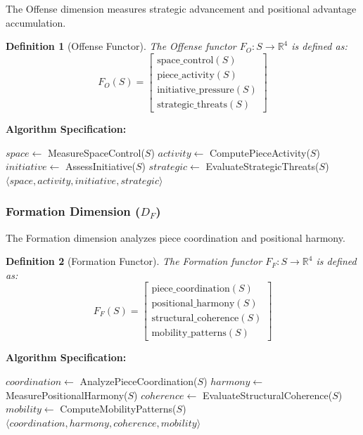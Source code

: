 \documentclass[12pt,a4paper]{article}
\newtheorem{definition}{Definition}
\begin{document}
The Offense dimension measures strategic advancement and positional advantage accumulation.

\begin{definition}[Offense Functor]
The Offense functor $F_O: S \rightarrow \mathbb{R}^4$ is defined as:
$$F_O(S) = \begin{bmatrix}
\text{space\_control}(S) \\
\text{piece\_activity}(S) \\
\text{initiative\_pressure}(S) \\
\text{strategic\_threats}(S)
\end{bmatrix}$$
\end{definition}

\textbf{Algorithm Specification:}
\begin{algorithm}[H]
\caption{Offense Algorithm}
\begin{algorithmic}
    \State $space \leftarrow$ MeasureSpaceControl($S$)
    \State $activity \leftarrow$ ComputePieceActivity($S$)
    \State $initiative \leftarrow$ AssessInitiative($S$)
    \State $strategic \leftarrow$ EvaluateStrategicThreats($S$)
    \State \Return $\langle space, activity, initiative, strategic \rangle$
\EndFunction
\end{algorithmic}
\end{algorithm}

\subsubsection{Formation Dimension (\texorpdfstring{$D_F$}{DF})}

The Formation dimension analyzes piece coordination and positional harmony.

\begin{definition}[Formation Functor]
The Formation functor $F_F: S \rightarrow \mathbb{R}^4$ is defined as:
$$F_F(S) = \begin{bmatrix}
\text{piece\_coordination}(S) \\
\text{positional\_harmony}(S) \\
\text{structural\_coherence}(S) \\
\text{mobility\_patterns}(S)
\end{bmatrix}$$
\end{definition}

\textbf{Algorithm Specification:}
\begin{algorithm}[H]
\caption{Formation Algorithm}
\begin{algorithmic}
    \State $coordination \leftarrow$ AnalyzePieceCoordination($S$)
    \State $harmony \leftarrow$ MeasurePositionalHarmony($S$)
    \State $coherence \leftarrow$ EvaluateStructuralCoherence($S$)
    \State $mobility \leftarrow$ ComputeMobilityPatterns($S$)
    \State \Return $\langle coordination, harmony, coherence, mobility \rangle$
\EndFunction
\end{algorithmic}
\end{algorithm}
\end{document}
